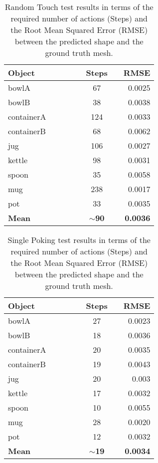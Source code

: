 \begin{table}
    \centering
    \begin{tabularx}{0.95\columnwidth}{lccccccr}
        \toprule
        Object &&& & & Steps && RMSE \\
        \midrule
        bowlA &&& & &67 && 0.0025\\
        bowlB &&& & &38 && 0.0038\\
        containerA &&&&& 124 && 0.0033\\
        containerB &&&&& 68 && 0.0062\\
        jug &&&&& 106 && 0.0027\\
        kettle &&&&& 98 && 0.0031\\
        spoon &&&&& 35 && 0.0058\\
        mug &&&&& 238 && 0.0017\\
        pot &&&&& 33 && 0.0035\\
        \midrule
        \textbf{Mean} &&&&& $\sim$\textbf{90} && \textbf{0.0036}\\
        \bottomrule
    \end{tabularx}
    \caption{Random Touch test results in terms of the required
    number of actions (Steps) and the Root Mean Squared Error (RMSE) between
    the predicted shape and the ground truth mesh.}
    \label{tab:test1}
\end{table}
\begin{table}
    \centering
    \begin{tabularx}{0.95\columnwidth}{lccccccr}
        \toprule
        Object &&& & & Steps && RMSE \\
        \midrule
        bowlA &&& & &27 && 0.0023\\
        bowlB &&& & &18 && 0.0036\\
        containerA &&&&& 20 && 0.0035\\
        containerB &&&&& 19 && 0.0043\\
        jug &&&&& 20 && 0.003\\
        kettle &&&&& 17 && 0.0032\\
        spoon &&&&& 10 && 0.0055\\
        mug &&&&& 28 && 0.0020\\
        pot &&&&& 12 && 0.0032\\
        \midrule
        \textbf{Mean} &&&&& $\sim$\textbf{19} && \textbf{0.0034}\\
        \bottomrule
    \end{tabularx}
    \caption{Single Poking test results in terms of the required
    number of actions (Steps) and the Root Mean Squared Error (RMSE) between
    the predicted shape and the ground truth mesh.}
    \label{tab:test2}
\end{table}
